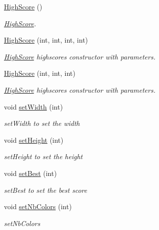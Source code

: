 \begin{DoxyCompactItemize}
\item 
\hyperlink{classoli_1_1_high_score_a0d912d7674165be2873897b1d62ccccf}{High\+Score} ()
\begin{DoxyCompactList}\small\item\em \hyperlink{classoli_1_1_high_score}{High\+Score}. \end{DoxyCompactList}\item 
\hyperlink{classoli_1_1_high_score_ac59979c25b9bb0d937f883dcb66a6db5}{High\+Score} (int, int, int, int)
\begin{DoxyCompactList}\small\item\em \hyperlink{classoli_1_1_high_score}{High\+Score} highscore\textquotesingle{}s constructor with parameters. \end{DoxyCompactList}\item 
\hyperlink{classoli_1_1_high_score_aa7566dd6d1287aa5c9a248248bf61b59}{High\+Score} (int, int, int)
\begin{DoxyCompactList}\small\item\em \hyperlink{classoli_1_1_high_score}{High\+Score} highscore\textquotesingle{}s constructor with parameters. \end{DoxyCompactList}\item 
void \hyperlink{classoli_1_1_high_score_a161063aa9576b92bf4d1f64af7a7850c}{set\+Width} (int)
\begin{DoxyCompactList}\small\item\em set\+Width to set the width \end{DoxyCompactList}\item 
void \hyperlink{classoli_1_1_high_score_aa3e83b28bf2f086cc19f2049d508fe03}{set\+Height} (int)
\begin{DoxyCompactList}\small\item\em set\+Height to set the height \end{DoxyCompactList}\item 
void \hyperlink{classoli_1_1_high_score_a2a8626c74ae1c37f49bd4334600f493c}{set\+Best} (int)
\begin{DoxyCompactList}\small\item\em set\+Best to set the best score \end{DoxyCompactList}\item 
void \hyperlink{classoli_1_1_high_score_a1f4db3a9679c923b21530a91d17d40fa}{set\+Nb\+Colors} (int)
\begin{DoxyCompactList}\small\item\em set\+Nb\+Colors \end{DoxyCompactList}\item 

\end{DoxyCompactItemize}
